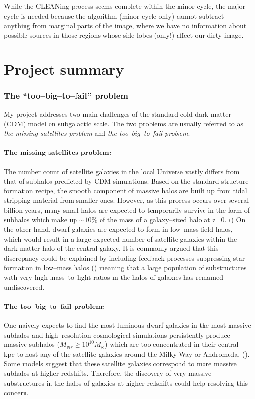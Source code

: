 \documentclass[paper=a4, fontsize=11pt]{scrartcl} %
\numberwithin{equation}{section} %
\numberwithin{figure}{section} %
\numberwithin{table}{section} %
\begin{document}
While the CLEANing process seems complete within the minor cycle, the major cycle is needed because the algorithm (minor cycle only) cannot subtract anything from marginal parts of the image, where we have no information about possible sources in those regions whose side lobes (only!) affect our dirty image.



\newpage
\section{Project summary}
\subsubsection*{The ``too--big--to--fail'' problem}
My project addresses two main challenges of the standard cold dark matter (CDM) model on subgalactic scale. The two problems are usually referred to as \emph{the missing satellites problem} and \emph{the too--big--to--fail problem}. 
\paragraph{The missing satellites problem:}
The number count of satellite galaxies in the local Universe vastly differs from that of subhalos predicted by CDM simulations. Based on the standard structure formation recipe, the smooth component of massive halos are built up from tidal stripping material from smaller ones. However, as this process occurs over several billion years, many small halos are expected to temporarily survive in the form of subhalos which make up $\sim 10\%$ of the mass of a galaxy--sized halo at z=0. (\cite{Gao11, Maciejewski11}) On the other hand, dwarf galaxies are expected to form in low--mass field halos, which would result in a large expected number of satellite galaxies within the dark matter halo of the central galaxy. It is commonly argued that this discrepancy could be explained by including feedback processes suppressing star formation in low--mass halos (\cite{Maccio10, Font11}) meaning that a large population of substructures with very high mass--to--light ratios in the halos of galaxies has remained undiscovered.
\paragraph{The too--big--to--fail problem:}
One naively expects to find the most luminous dwarf galaxies in the most massive subhalos and high--resolution cosmological simulations persistently produce massive subhalos ($M_{vir} \geq 10^{10} M_\odot$) which are too concentrated in their central kpc to host any of the satellite galaxies around the Milky Way or Andromeda. (\cite{Boylan--Kolchin11}). Some models suggest that these satellite galaxies correspond to more massive subhalos at higher redshifts. Therefore, the discovery of very massive substructures in the halos of galaxies at higher redshifts could help resolving this concern.
\end{document}
